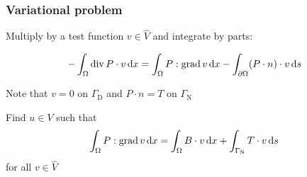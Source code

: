 \begin{frame}
  \frametitle{Variational problem}

  Multiply by a test function $v \in \hat{V}$ and integrate by parts:

  \begin{equation*}
    - \int_{\Omega} \operatorname{\mathrm{div}} P \cdot v \, \mathrm{d}x
    = \int_{\Omega} P : \operatorname{\mathrm{grad}} v \, \mathrm{d}x - \int_{\partial\Omega} (P \cdot n) \cdot v \, \mathrm{d}s
  \end{equation*}

  Note that $v = 0$ on $\Gamma_{\mathrm{D}}$ and $P \cdot n = T$ on
  $\Gamma_{\mathrm{N}}$

  \bigskip
  \bigskip

  Find $u \in V$ such that
  \begin{equation*}
    \int_{\Omega} P : \operatorname{\mathrm{grad}} v \, \mathrm{d}x
    = \int_{\Omega} B \cdot v \, \mathrm{d}x + \int_{\Gamma_{\mathrm{N}}} T \cdot v \, \mathrm{d}s
  \end{equation*}
  for all $v \in \hat{V}$

\end{frame}
